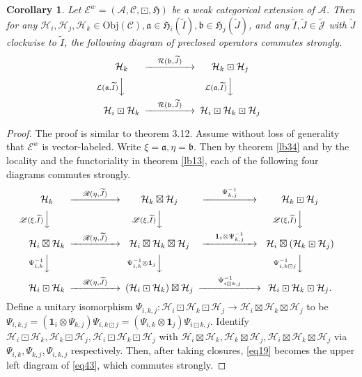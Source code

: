 \documentclass[12pt,a4paper]{article}
\theoremstyle{definition}
\theoremstyle{plain}
\newtheorem{co}[df]{Corollary}
\newcommand{\fk}{\mathfrak}
\newcommand{\mc}{\mathcal}
\newcommand{\wtd}{\widetilde}
\newcommand{\id}{\mathbf{1}}
\newcommand{\scr}{\mathscr}
\newcommand{\Jtd}{\widetilde{\mathcal J}}
\newcommand{\Obj}{\mathrm{Obj}}
\numberwithin{equation}{subsection}
\begin{document}
\begin{co}\label{lb35}
Let $\scr E^w=(\mc A,\scr C,\boxdot,\fk H)$ be a  weak categorical extension of $\mc A$. Then for any $\mc H_i,\mc H_j,\mc H_k\in\Obj(\scr C),\fk a\in\fk H_i(\wtd I),\fk b\in\fk H_j(\wtd J)$, and any $\wtd I,\wtd J\in\Jtd$ with $\wtd J$ clockwise to $\wtd I$, the following diagram of preclosed operators commutes strongly.
\begin{align}
\begin{CD}
\mc H_k @> \quad \mc R(\fk b,\wtd J)\quad   >> \mc H_k\boxdot\mc H_j\\
@V \mc L(\fk a,\wtd I)   V  V @V \mc L(\fk a,\wtd I) VV\\
\mc H_i\boxdot\mc H_k @> \quad \mc R(\fk b,\wtd J) \quad  >> \mc H_i\boxdot\mc H_k\boxdot\mc H_j
\end{CD}\label{eq19}
\end{align}
\end{co}


\begin{proof}
The proof is similar to \cite{Gui21a} theorem 3.12. Assume without loss of generality that $\scr E^w$ is vector-labeled. Write $\xi=\fk a,\eta=\fk b$. Then by theorem \ref{lb34} and by the locality and the functoriality in theorem \ref{lb13}, each of the following four diagrams commutes strongly.
\begin{align}
\begin{CD}
\mc H_k @> \quad \scr R(\eta,\wtd J)\quad   >> \mc H_k\boxtimes\mc H_j  @> ~~\quad\Psi^{-1}_{k,j}\quad~~ >> \mc H_k\boxdot\mc H_j \\
@V \scr L(\xi,\wtd I)   V  V @V \scr L(\xi,\wtd I) VV   @V  \scr L(\xi,\wtd I) VV\\
\mc H_i\boxtimes\mc H_k @> \quad \scr R(\eta,\wtd J) \quad  >> \mc H_i\boxtimes\mc H_k\boxtimes\mc H_j  @> \quad\id_i\otimes\Psi^{-1}_{k,j}\quad >>\mc H_i\boxtimes(\mc H_k\boxdot\mc H_j)\\
@ V \Psi^{-1}_{i,k} VV  @V \Psi^{-1}_{i,k}\otimes\id_j VV  @V \Psi^{-1}_{i,k\boxdot j}VV\\
\mc H_i\boxdot\mc H_k  @> \quad \scr R(\eta,\wtd J)\quad >> (\mc H_i\boxdot \mc H_k)\boxtimes\mc H_j  @> ~~\quad\Psi^{-1}_{i\boxdot k,j}\quad~~ >> \mc H_i\boxdot\mc H_k\boxdot\mc H_j.
\end{CD}\label{eq43}
\end{align}
Define a unitary isomorphism $\Psi_{i,k,j}:\mc H_i\boxdot\mc H_k\boxdot\mc H_j\rightarrow \mc H_i\boxtimes\mc H_k\boxtimes\mc H_j$ to be $\Psi_{i,k,j}=(\id_i\otimes\Psi_{k,j})\Psi_{i,k\boxdot j}=(\Psi_{i,k}\otimes\id_j)\Psi_{i\boxdot k,j}$. Identify $\mc H_i\boxdot\mc H_k,\mc H_k\boxdot\mc H_j,\mc H_i\boxdot\mc H_k\boxdot\mc H_j$ with $\mc H_i\boxtimes\mc H_k,\mc H_k\boxtimes\mc H_j,\mc H_i\boxtimes\mc H_k\boxtimes\mc H_j$ via $\Psi_{i,k},\Psi_{k,j},\Psi_{i,k,j}$ respectively. Then, after taking closures, \eqref{eq19} becomes the upper left diagram of \eqref{eq43}, which commutes strongly.
\end{proof}
\end{document}
